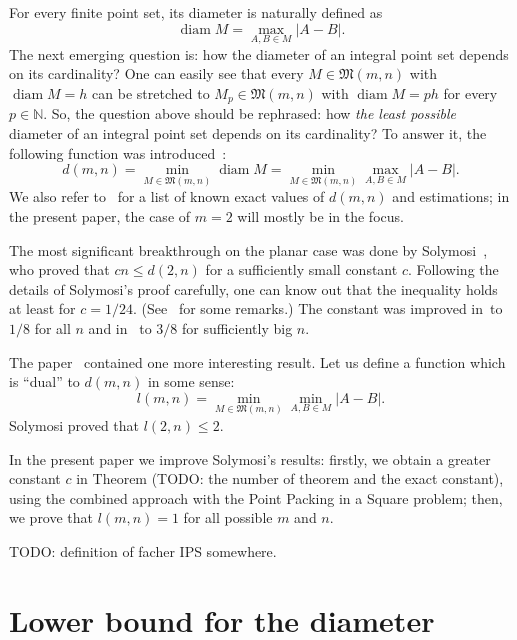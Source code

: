 \documentclass[a4paper,14pt]{article} %
\theoremstyle{plain}
\theoremstyle{definition}
\begin{document}
For every finite point set, its diameter is naturally defined as
\begin{equation}
	\operatorname{diam} M = \max_{A,B\in M} |A-B|
	.
\end{equation}
The next emerging question is: how the diameter of an integral point set depends on its cardinality?
One can easily see that every $M\in\mathfrak{M}(m,n)$ with $\operatorname{diam} M = h$
can be stretched to $M_p\in\mathfrak{M}(m,n)$ with $\operatorname{diam} M = ph$
for every $p\in\mathbb{N}$.
So, the question above should be rephrased:
how \textit{the least possible} diameter of an integral point set depends on its cardinality?
To answer it, the following function was introduced~\cite{kurz2008bounds,kurz2008minimum}:
\begin{equation}
	d(m,n) = \min_{M\in\mathfrak{M}(m,n)} \operatorname{diam} M = \min_{M\in\mathfrak{M}(m,n)} \max_{A,B\in M} |A-B|
	.
\end{equation}
We also refer to~\cite{kurz2008bounds} for a list of known exact values of $d(m,n)$
and estimations; in the present paper, the case of $m=2$ will mostly be in the focus.

The most significant breakthrough on the planar case was done by Solymosi~\cite{solymosi2003note},
who proved that $cn \leq d(2,n)$ for a sufficiently small constant $c$.
Following the details of Solymosi's proof carefully,
one can know out that the inequality holds at least for $c = 1/24$.
(See~\cite[Exercise 2.6]{garibaldi2005erdos} for some remarks.)
The constant was improved in~\cite{our-mz-rus}to $1/8$ for all $n$ and in~\cite{our-vmmsh-2018}
to $3/8$ for sufficiently big $n$.

The paper~\cite{solymosi2003note} contained one more interesting result.
Let us define a function which is ``dual'' to $d(m,n)$ in some sense:
\begin{equation}
	l(m,n) = \min_{M\in\mathfrak{M}(m,n)} \min_{A,B\in M} |A-B|
	.
\end{equation}
Solymosi proved that $l(2,n)\leq 2$.

In the present paper we improve Solymosi's results:
firstly, we obtain a greater constant $c$ in Theorem (TODO: the number of theorem and the exact constant),
using the combined approach with the Point Packing in a Square problem;
then, we prove that $l(m,n)=1$ for all possible $m$ and $n$.


TODO: definition of facher IPS somewhere.

\section{Lower bound for the diameter}
\end{document}
